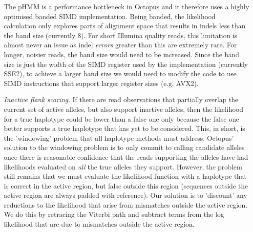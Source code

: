 \documentclass[notitlepage, twocolumn, 10pt]{article}
\begin{document}
The pHMM is a performance bottleneck in Octopus and it therefore uses a highly optimised banded SIMD implementation. Being banded, the likelihood calculation only explores parts of alignment space that results in indels less than the band size (currently 8). For short Illumina quality reads, this limitation is almost never an issue as indel \emph{errors} greater than this are extremely rare. For longer, noisier reads, the band size would need to be increased. Since the band size is just the width of the SIMD register used by the implementation (currently SSE2), to achieve a larger band size we would need to modify the code to use SIMD instructions that support larger register sizes (e.g. AVX2).

\vspace{3mm}
\noindent\emph{Inactive flank scoring.} If there are read observations that partially overlap the current set of active alleles, but also support inactive alleles, then the likelihood for a true haplotype could be lower than a false one only because the false one better supports a true haplotype that has yet to be considered. This, in short, is the 'windowing' problem that all haplotype methods must address. Octopus' solution to the windowing problem is to only commit to calling candidate alleles once there is reasonable confidence that the reads supporting the alleles have had likelihoods evaluated on \emph{all} the true alleles they support. However, the problem still remains that we must evaluate the likelihood function with a haplotype that is correct in the active region, but false outside this region (sequences outside the active region are always padded with reference). Our solution is to 'discount' any reductions to the likelihood that arise from mismatches outside the active region. We do this by retracing the Viterbi path and subtract terms from the log likelihood that are due to mismatches outside the active region.
\end{document}

